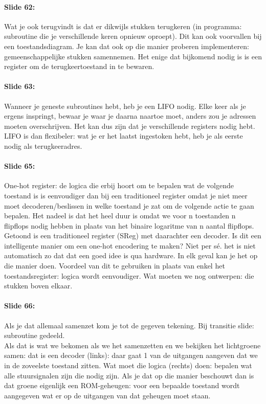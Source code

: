 \documentclass[10pt,a4paper]{book}
\begin{document}
\paragraph{Slide 62:} Wat je ook terugvindt is dat er dikwijls stukken terugkeren (in programma: subroutine die je verschillende keren opnieuw oproept). Dit kan ook voorvallen bij een toestandsdiagram. Je kan dat ook op die manier proberen implementeren: gemeenschappelijke stukken samennemen. Het enige dat bijkomend nodig is is een register om de terugkeertoestand in te bewaren. 

\paragraph{Slide 63:} Wanneer je geneste subroutines hebt, heb je een LIFO nodig. Elke keer als je ergens inspringt, bewaar je waar je daarna naartoe moet, anders zou je adressen moeten overschrijven. Het kan dus zijn dat je verschillende registers nodig hebt. LIFO is dan flexibeler: wat je er het laatst ingestoken hebt, heb je als eerste nodig als terugkeeradres. 

\paragraph{Slide 65:} One-hot register: de logica die erbij hoort om te bepalen wat de volgende toestand is is eenvoudiger dan bij een traditioneel register omdat je niet meer moet decoderen/beslissen in welke toestand je zat om de volgende actie te gaan bepalen. Het nadeel is dat het heel duur is omdat we voor n toestanden n flipflops nodig hebben in plaats van het binaire logaritme van n aantal flipflops.\\
Getoond is een traditioneel register (SReg) met daarachter een decoder. Is dit een intelligente manier om een one-hot encodering te maken? Niet per s\'e. het is niet automatisch zo dat dat een goed idee is qua hardware. In elk geval kan je het op die manier doen. Voordeel van dit te gebruiken in plaats van enkel het toestandsregister: logica wordt eenvoudiger. Wat moeten we nog ontwerpen: die stukken boven elkaar. 

\paragraph{Slide 66:} Als je dat allemaal samenzet kom je tot de gegeven tekening. Bij transitie slide: subroutine gedeeld.\\
Als dat is wat we bekomen als we het samenzetten en we bekijken het lichtgroene samen: dat is een decoder (links): daar gaat 1 van de uitgangen aangeven dat we in de zoveelste toestand zitten. Wat moet die logica (rechts) doen: bepalen wat alle stuursignalen zijn die nodig zijn. Als je dat op die manier beschouwt dan is dat groene eigenlijk een ROM-geheugen: voor een bepaalde toestand wordt aangegeven wat er op de uitgangen van dat geheugen moet staan.
\end{document}
